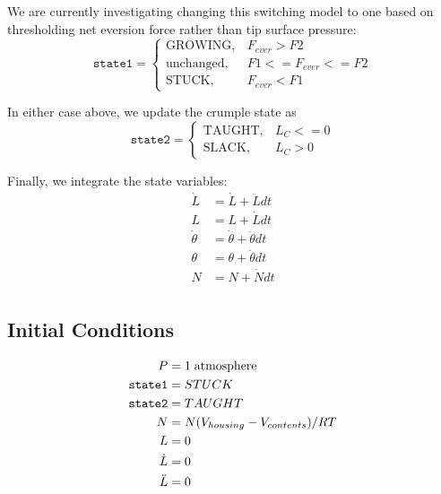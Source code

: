 \documentclass[letterpaper]{article}
\begin{document}
We are currently investigating changing this switching model to one based on thresholding
net eversion force rather than tip surface pressure:
\begin{equation}
    \mathtt{state1} =
    \begin{cases}
      \mathrm{GROWING},   &  F_{ever} > F2 \\
      \mathrm{unchanged}, &  F1 <= F_{ever} <= F2 \\
      \mathrm{STUCK},     &  F_{ever} < F1
    \end{cases}
\end{equation}

In either case above, we update the crumple state as
\begin{equation}
    \mathtt{state2} =
    \begin{cases}
      \mathrm{TAUGHT},  &  L_C <=0 \\
      \mathrm{SLACK},   &  L_C  > 0
    \end{cases}
\end{equation}

Finally, we integrate the state variables:
\begin{equation}
\begin{aligned}
  \dot{L} &= \dot{L} +  \ddot{L}  dt \\
  L       &= L + \dot{L}  dt \\
  \dot{\theta} &= \dot{\theta} + \ddot{\theta}dt \\
  \theta &= \theta + \dot{\theta} dt\\
  N &= N + \dot{N}  dt\\
\end{aligned}
\end{equation}


\subsection{Initial Conditions}
\begin{equation}
\begin{aligned}
  P &= 1 \; \mathrm{atmosphere}\\
  {\tt state1} &= STUCK \\
  {\tt state2} &= TAUGHT \\
  N &= N(V_{housing} - V_{contents}) / RT \\
  L &= 0\\
  \dot{L} &= 0\\
  \ddot{L} &= 0\\
\end{aligned}
\end{equation}
\end{document}
